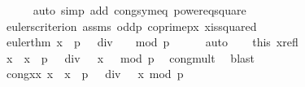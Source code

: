 \begin{isabellebody}
\ \ \ \ \isamarkupfalse%
\ {\isacharparenleft}{\kern0pt}auto\ simp\ add{\isacharcolon}{\kern0pt}\ cong{\isacharunderscore}{\kern0pt}sym{\isacharunderscore}{\kern0pt}eq\ power{}{\isacharunderscore}{\kern0pt}eq{\isacharunderscore}{\kern0pt}square{\isacharparenright}{\kern0pt}\isanewline
\ \ \isanewline
\ \ \isamarkupfalse%
\ eulers{\isacharunderscore}{\kern0pt}criterion\ assms{\isacharparenleft}{\kern0pt}{}{\isacharparenright}{\kern0pt}\ odd{\isacharunderscore}{\kern0pt}p\ coprime{\isacharunderscore}{\kern0pt}p{\isacharunderscore}{\kern0pt}x\ x{\isacharunderscore}{\kern0pt}is{\isacharunderscore}{\kern0pt}squared\ \isamarkupfalse%
\ euler{\isacharunderscore}{\kern0pt}thm{\isacharcolon}{\kern0pt}\ {\isachardoublequoteopen}{\isacharbrackleft}{\kern0pt}x\ {\isacharcircum}{\kern0pt}\ {\isacharparenleft}{\kern0pt}{\isacharparenleft}{\kern0pt}p\ {\isacharminus}{\kern0pt}\ {}{\isacharparenright}{\kern0pt}\ div\ {}{\isacharparenright}{\kern0pt}\ {\isacharequal}{\kern0pt}\ {}{\isacharbrackright}{\kern0pt}\ {\isacharparenleft}{\kern0pt}mod\ p{\isacharparenright}{\kern0pt}{\isachardoublequoteclose}\isanewline
\ \ \ \ \isamarkupfalse%
\ auto\isanewline
\isanewline
\ \ \isamarkupfalse%
\ this\ x{\isacharunderscore}{\kern0pt}refl\ \isamarkupfalse%
\ {\isachardoublequoteopen}{\isacharbrackleft}{\kern0pt}x\ {\isacharasterisk}{\kern0pt}\ x\ {\isacharcircum}{\kern0pt}\ {\isacharparenleft}{\kern0pt}{\isacharparenleft}{\kern0pt}p\ {\isacharminus}{\kern0pt}\ {}{\isacharparenright}{\kern0pt}\ div\ {}{\isacharparenright}{\kern0pt}\ {\isacharequal}{\kern0pt}\ x\ {\isacharasterisk}{\kern0pt}\ {}{\isacharbrackright}{\kern0pt}\ {\isacharparenleft}{\kern0pt}mod\ p{\isacharparenright}{\kern0pt}{\isachardoublequoteclose}\ \isamarkupfalse%
\ cong{\isacharunderscore}{\kern0pt}mult\ \isamarkupfalse%
\ blast\isanewline
\ \ \isamarkupfalse%
\ \isamarkupfalse%
\ cong{\isacharunderscore}{\kern0pt}xx{\isacharcolon}{\kern0pt}\ {\isachardoublequoteopen}{\isacharbrackleft}{\kern0pt}x\ {\isacharasterisk}{\kern0pt}\ x\ {\isacharcircum}{\kern0pt}\ {\isacharparenleft}{\kern0pt}{\isacharparenleft}{\kern0pt}p\ {\isacharminus}{\kern0pt}\ {}{\isacharparenright}{\kern0pt}\ div\ {}{\isacharparenright}{\kern0pt}\ {\isacharequal}{\kern0pt}\ x{\isacharbrackright}{\kern0pt}\ {\isacharparenleft}{\kern0pt}mod\ p{\isacharparenright}{\kern0pt}{\isachardoublequoteclose}\ \isamarkupfalse%

\end{isabellebody}
